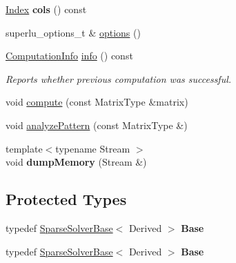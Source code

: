 \begin{DoxyCompactItemize}
\hyperlink{namespace_eigen_a62e77e0933482dafde8fe197d9a2cfde}{Index} {\bfseries cols} () const
\item 
superlu\+\_\+options\+\_\+t \& \hyperlink{class_eigen_1_1_super_l_u_base_a42d9d79073379f1e75b0f2c49879ed5b}{options} ()
\item 
\hyperlink{group__enums_ga85fad7b87587764e5cf6b513a9e0ee5e}{Computation\+Info} \hyperlink{class_eigen_1_1_super_l_u_base_aa67da5c8c24110931c949c5896c5ec03}{info} () const
\begin{DoxyCompactList}\small\item\em Reports whether previous computation was successful. \end{DoxyCompactList}\item 
void \hyperlink{class_eigen_1_1_super_l_u_base_a28cb3ef7914ecb6fdae1935b53f6be40}{compute} (const Matrix\+Type \&matrix)
\item 
void \hyperlink{class_eigen_1_1_super_l_u_base_a2d3f48425328d9b3cbdca369889007f3}{analyze\+Pattern} (const Matrix\+Type \&)
\item 
\mbox{\label{class_eigen_1_1_super_l_u_base_a238acfa9eecf87b8e20d2aa4bba64ae5}} 
{\footnotesize template$<$typename Stream $>$ }\\void {\bfseries dump\+Memory} (Stream \&)
\end{DoxyCompactItemize}
\subsection*{Protected Types}
\begin{DoxyCompactItemize}
\item 
\mbox{\label{class_eigen_1_1_super_l_u_base_a5e89915a44120a3e63c22143b2ce847e}} 
typedef \hyperlink{group___sparse_core___module_class_eigen_1_1_sparse_solver_base}{Sparse\+Solver\+Base}$<$ Derived $>$ {\bfseries Base}
\item 
\mbox{\label{class_eigen_1_1_super_l_u_base_a5e89915a44120a3e63c22143b2ce847e}} 
typedef \hyperlink{group___sparse_core___module_class_eigen_1_1_sparse_solver_base}{Sparse\+Solver\+Base}$<$ Derived $>$ {\bfseries Base}
\end{DoxyCompactItemize}
